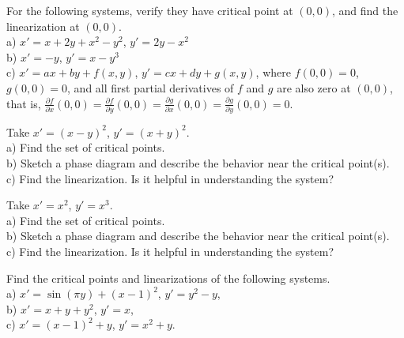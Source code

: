 \documentclass[12pt]{book}
\begin{document}
\begin{exercise}
For the following systems, verify they have critical point at $(0,0)$,
and find the linearization at $(0,0)$.\\
a) $x'=x+2y+x^2-y^2$, $y'=2y-x^2$\\
b) $x'=-y$, $y'=x-y^3$\\
c) $x'=ax+by+f(x,y)$, $y'=cx+dy+g(x,y)$, where
$f(0,0) = 0$,
$g(0,0) = 0$, and all first partial derivatives of $f$ and $g$ are
also zero at $(0,0)$, that is,
$\frac{\partial f}{\partial x}(0,0) = 
\frac{\partial f}{\partial y}(0,0) = 
\frac{\partial g}{\partial x}(0,0) = 
\frac{\partial g}{\partial y}(0,0) = 0$.
\end{exercise}

\begin{exercise}
Take $x'=(x-y)^2$, $y'=(x+y)^2$. \\
a) Find the set of critical points. \\
b) Sketch a phase diagram and describe the behavior near the critical
point(s). \\
c) Find the linearization.  Is it helpful in understanding the system?
\end{exercise}

\begin{exercise}
Take $x'=x^2$, $y'=x^3$. \\
a) Find the set of critical points. \\
b) Sketch a phase diagram and describe the behavior near the critical
point(s). \\
c) Find the linearization.  Is it helpful in understanding the system?
\end{exercise}

\setcounter{exercise}{100}

\begin{exercise}
Find the critical points and linearizations of the following systems.\\
a) $x'=\sin(\pi y)+(x-1)^2$, $y'=y^2-y$,\\
b) $x'=x+y+y^2$, $y'=x$,\\
c) $x'=(x-1)^2+y$, $y'=x^2+y$.
\end{exercise}
\end{document}
